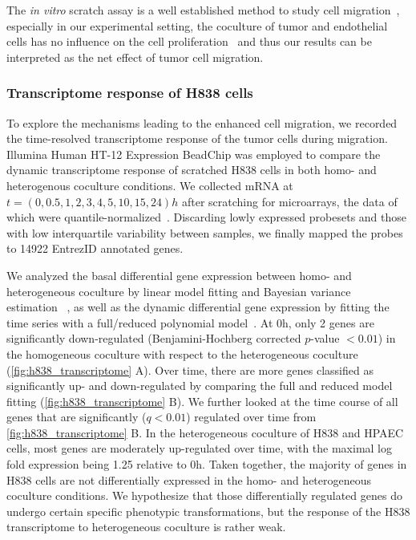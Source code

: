The \emph{in vitro} scratch assay is a well established method
to study cell migration~\citep{Busch2008,Liang2007}, especially
in our experimental setting, the coculture of tumor and 
endothelial cells has no influence on the cell proliferation~%
\citep{Dauscher2012} and thus our results can be interpreted
as the net effect of tumor cell migration.

\subsubsection{Transcriptome response of H838 cells}
To explore the mechanisms leading to the enhanced cell migration, we recorded the time-resolved transcriptome response of the tumor cells during migration.
Illumina Human HT-12 Expression BeadChip was employed to compare the dynamic transcriptome response of scratched H838 cells in both homo- and heterogenous coculture conditions.
We collected mRNA at $t=(0,0.5,1,2,3,4,5,10,15,24)h$ after scratching for microarrays,
the data of which were quantile-normalized~\citep{Dunning2008a}.  
Discarding lowly expressed probesets and those with low interquartile 
variability between samples, we finally mapped the probes to 14922 EntrezID 
annotated genes. 

We analyzed the basal differential gene expression between homo- and
heterogeneous coculture by linear model fitting and Bayesian variance estimation~%
\citep{Smyth2004}, as well as the dynamic differential gene expression by fitting
the time series with a full/reduced polynomial model~\citep{Mar2009}. At 0h, only 2
genes are significantly down-regulated (Benjamini-Hochberg
corrected $p$-value $<0.01$) in the homogeneous coculture with respect
to the heterogeneous coculture 
(\ref{fig:h838_transcriptome} A). Over time, there are more
genes classified as significantly up- and down-regulated by comparing the full and
reduced model fitting (\ref{fig:h838_transcriptome} B). 
We further looked at the time course of all genes that are
significantly ($q<0.01$) regulated over time from 
\ref{fig:h838_transcriptome} B. In the heterogeneous
coculture of H838 and HPAEC cells, most genes are 
moderately up-regulated over time, with the maximal
log fold expression being 1.25 relative to 0h.
Taken together, the majority of genes
in H838 cells are not differentially expressed in the homo- and heterogeneous
coculture conditions. We hypothesize that those 
differentially regulated genes do undergo certain specific
phenotypic transformations, but the response of the H838
transcriptome to heterogeneous coculture is rather weak.

